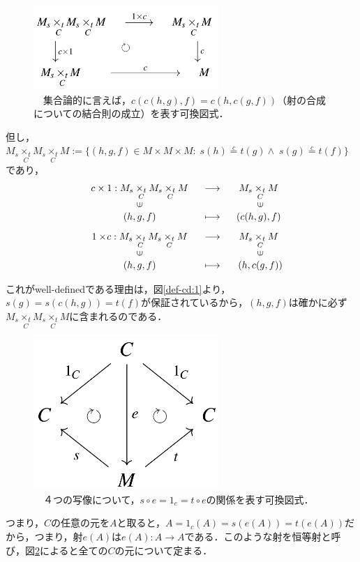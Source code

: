 \documentclass[uplatex, 12pt, a4paper, dvipdfmx]{jsarticle}
\begin{document}
\begin{figure}[ht] \begin{center}  \caption{\label{def-cd:2}　集合論的に言えば，$c(c(h,g),f)=c(h,c(g,f))$（射の合成についての結合則の成立）を表す可換図式．}
    \includegraphics[width=7cm]{cd-2.png}
\end{center}\end{figure}
但し，$M_s \underset{C}{\times_t}M_s \underset{C}{\times_t}M := \{ (h,g,f)\in M\times M\times M : \; s(h)\overset{c}{=} t(g) \wedge \; s(g) \overset{c}{=} t(f) \}$であり，$$\begin{array}{ccc}
        c\times1:M_s\underset{C}{\times_t}M_s\underset{C}{\times_t}M & \longrightarrow & M_s\underset{C}{\times_t}M \\
        \rotatebox{90}{$\in$} & & \rotatebox{90}{$\in$}\\
        (h,g,f) & \longmapsto & (c(h,g),f) \\[3mm]
        1\times \! c:M_s\underset{C}{\times_t}M_s\underset{C}{\times_t}M & \longrightarrow & M_s\underset{C}{\times_t}M \\
        \rotatebox{90}{$\in$} & & \rotatebox{90}{$\in$}\\
        (h,g,f) & \longmapsto & (h,c(g,f))
\end{array}$$

これがwell-definedである理由は，図\ref{def-cd:1}より，$s(g)=s(c(h,g))=t(f)$が保証されているから，$(h,g,f)$は確かに必ず$M_s \underset{C}{\times_t}M_s \underset{C}{\times_t}M$に含まれるのである．\\[3cm]

\begin{figure}[ht] \begin{center}  \caption{\label{def-cd:3}　４つの写像について，$s\circ e=1_c=t\circ e$の関係を表す可換図式．}
    \includegraphics[width=7cm]{cd-3.png}
\end{center}\end{figure}
つまり，$C$の任意の元を$A$と取ると，$A=1_c(A)=s(e(A))=t(e(A))$だから，つまり，射$e(A)$は$e(A):A\longrightarrow A$である．このような射を恒等射と呼び，図\ref{def-cd:3}によると全ての$C$の元について定まる．
\end{document}
